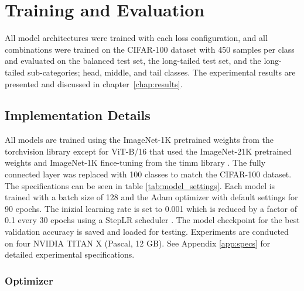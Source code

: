 \section{Training and Evaluation}

All model architectures were trained with each loss configuration, and all combinations were trained on the CIFAR-100 dataset with 450 samples per class and evaluated on the balanced test set, the long-tailed test set, and the long-tailed sub-categories; head, middle, and tail classes. The experimental results are presented and discussed in chapter~\ref{chap:results}.

\subsection{Implementation Details}
All models are trained using the ImageNet-1K pretrained weights from the torchvision library \cite{torchvision-resnet,pytorch_mobilenetv2,torchvision2024convnextbase} except for ViT-B/16 that used the ImageNet-21K pretrained weights and ImageNet-1K fince-tuning from the timm library \cite{huggingface2024vitbase}. The fully connected layer was replaced with 100 classes to match the CIFAR-100 dataset. The specifications can be seen in table \ref{tab:model_settings}. Each model is trained with a batch size of 128 and the Adam optimizer \cite{kingma2017adammethodstochasticoptimization} with default settings for 90 epochs. The inizial learning rate is set to 0.001 which is reduced by a factor of 0.1 every 30 epochs using a StepLR scheduler \cite{pytorch_steplr}. The model checkpoint for the best validation accuracy is saved and loaded for testing. Experiments are conducted on four NVIDIA TITAN X (Pascal, 12 GB). See Appendix \ref{app:specs} for detailed experimental specifications.

\subsubsection{Optimizer}

